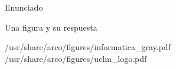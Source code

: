 \documentclass{arco-exam}
\begin{document}
\begin{questions}
\begin{arcoQuestion}{5}

\end{arcoQuestion}


\question
Enunciado

\begin{arcoQuestion}{5}
  Una figura y su respuesta

                     {/usr/share/arco/figures/informatica_gray.pdf}
                     {/usr/share/arco/figures/uclm_logo.pdf}
\end{arcoQuestion}


\end{questions}
\end{document}
